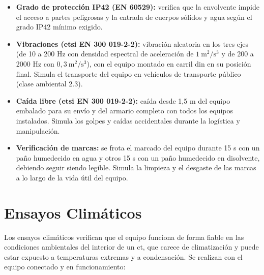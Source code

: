 \begin{itemize}
    \item \textbf{Grado de protección IP42 (EN 60529):} verifica que la envolvente impide el acceso a partes peligrosas y la entrada de cuerpos sólidos y agua según el grado IP42 mínimo exigido.
    \item \textbf{Vibraciones (\gls{etsi} EN 300 019-2-2):} vibración aleatoria en los tres ejes (de 10 a 200 Hz con densidad espectral de aceleración de $1\ \text{m}^2/\text{s}^3$ y de 200 a 2000 Hz con $0,3\ \text{m}^2/\text{s}^3$), con el equipo montado en carril \gls{din} en su posición final. Simula el transporte del equipo en vehículos de transporte público (clase ambiental 2.3).
    \item \textbf{Caída libre (\gls{etsi} EN 300 019-2-2):} caída desde 1,5 m del equipo embalado para su envío y del armario completo con todos los equipos instalados. Simula los golpes y caídas accidentales durante la logística y manipulación.
    \item \textbf{Verificación de marcas:} se frota el marcado del equipo durante 15 s con un paño humedecido en agua y otros 15 s con un paño humedecido en disolvente, debiendo seguir siendo legible. Simula la limpieza y el desgaste de las marcas a lo largo de la vida útil del equipo.
\end{itemize}

\section{Ensayos Climáticos}
\label{sec:ensayos_climaticos}

Los ensayos climáticos verifican que el equipo funciona de forma fiable en las condiciones ambientales del interior de un \gls{ct}, que carece de climatización y puede estar expuesto a temperaturas extremas y a condensación. Se realizan con el equipo conectado y en funcionamiento:

